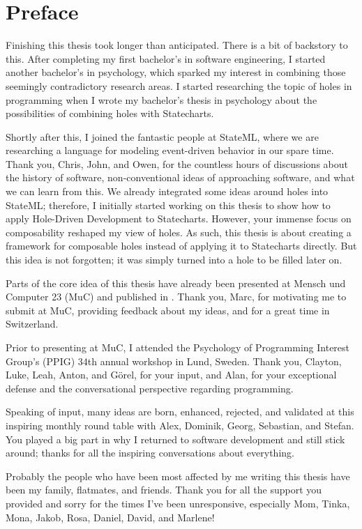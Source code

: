 \chapter{Preface}
Finishing this thesis took longer than anticipated.
There is a bit of backstory to this.
After completing my first bachelor's in software engineering, I started another bachelor's in psychology, which sparked my interest in combining those seemingly contradictory research areas.
I started researching the topic of holes in programming when I wrote my bachelor's thesis in psychology about the possibilities of combining holes with Statecharts.

Shortly after this, I joined the fantastic people at StateML, where we are researching a language for modeling event-driven behavior in our spare time.
Thank you, Chris, John, and Owen, for the countless hours of discussions about the history of software, non-conventional ideas of approaching software, and what we can learn from this.
We already integrated some ideas around holes into StateML; therefore, I initially started working on this thesis to show how to apply Hole-Driven Development to Statecharts.
However, your immense focus on composability reshaped my view of holes.
As such, this thesis is about creating a framework for composable holes instead of applying it to Statecharts directly.
But this idea is not forgotten; it was simply turned into a hole to be filled later on.

Parts of the core idea of this thesis have already been presented at Mensch und Computer 23 (MuC) and published in \cite{mayr_replacing_2023}.
Thank you, Marc, for motivating me to submit at MuC, providing feedback about my ideas, and for a great time in Switzerland.

Prior to presenting at MuC, I attended the Psychology of Programming Interest Group's (PPIG) 34th annual workshop in Lund, Sweden.
Thank you, Clayton, Luke, Leah, Anton, and Görel, for your input, and Alan, for your exceptional defense and the conversational perspective regarding programming.

Speaking of input, many ideas are born, enhanced, rejected, and validated at this inspiring monthly round table with Alex, Dominik, Georg, Sebastian, and Stefan.
You played a big part in why I returned to software development and still stick around; thanks for all the inspiring conversations about everything.

Probably the people who have been most affected by me writing this thesis have been my family, flatmates, and friends.
Thank you for all the support you provided and sorry for the times I've been unresponsive, especially Mom, Tinka, Mona, Jakob, Rosa, Daniel, David, and Marlene!

